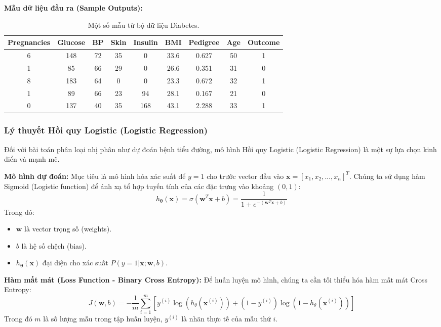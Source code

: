 \textbf{Mẫu dữ liệu đầu ra (Sample Outputs):}
\begin{table}[h]
\centering
\begin{tabular}{|c|c|c|c|c|c|c|c|c|}
\hline
Pregnancies & Glucose & BP & Skin & Insulin & BMI & Pedigree & Age & Outcome \\
\hline
6 & 148 & 72 & 35 & 0 & 33.6 & 0.627 & 50 & 1 \\
1 & 85  & 66 & 29 & 0 & 26.6 & 0.351 & 31 & 0 \\
8 & 183 & 64 & 0  & 0 & 23.3 & 0.672 & 32 & 1 \\
1 & 89  & 66 & 23 & 94& 28.1 & 0.167 & 21 & 0 \\
0 & 137 & 40 & 35 & 168&43.1 & 2.288 & 33 & 1 \\
\hline
\end{tabular}
\caption{Một số mẫu từ bộ dữ liệu Diabetes.}
\end{table}

\subsubsection{Lý thuyết Hồi quy Logistic (Logistic Regression)}
Đối với bài toán phân loại nhị phân như dự đoán bệnh tiểu đường, mô hình Hồi quy Logistic (Logistic Regression) là một sự lựa chọn kinh điển và mạnh mẽ. 

\textbf{Mô hình dự đoán:}
Mục tiêu là mô hình hóa xác suất để $y=1$ cho trước vector đầu vào $\mathbf{x} = [x_1, x_2, ..., x_n]^T$. Chúng ta sử dụng hàm Sigmoid (Logistic function) để ánh xạ tổ hợp tuyến tính của các đặc trưng vào khoảng $(0, 1)$:
\begin{equation}
h_{\mathbf{\theta}}(\mathbf{x}) = \sigma(\mathbf{w}^T\mathbf{x} + b) = \frac{1}{1 + e^{-(\mathbf{w}^T\mathbf{x} + b)}}
\end{equation}
Trong đó:
\begin{itemize}
    \item $\mathbf{w}$ là vector trọng số (weights).
    \item $b$ là hệ số chệch (bias).
    \item $h_{\mathbf{\theta}}(\mathbf{x})$ đại diện cho xác suất $P(y=1|\mathbf{x}; \mathbf{w}, b)$.
\end{itemize}

\textbf{Hàm mất mát (Loss Function - Binary Cross Entropy):}
Để huấn luyện mô hình, chúng ta cần tối thiểu hóa hàm mất mát Cross Entropy:
\begin{equation}
J(\mathbf{w}, b) = -\frac{1}{m} \sum_{i=1}^{m} \left[ y^{(i)} \log(h_{\theta}(\mathbf{x}^{(i)})) + (1 - y^{(i)}) \log(1 - h_{\theta}(\mathbf{x}^{(i)})) \right]
\end{equation}
Trong đó $m$ là số lượng mẫu trong tập huấn luyện, $y^{(i)}$ là nhãn thực tế của mẫu thứ $i$.

